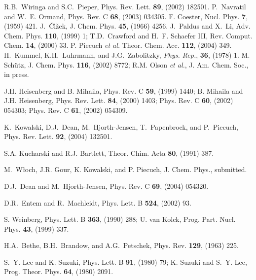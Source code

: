 \documentclass[epj]{svjour}
\begin{document}
\begin{thebibliography}{99}
%
R.B.~Wiringa and S.C.~Pieper, Phys. Rev. Lett. {\bf 89}, (2002) 182501.
%
P.~Navratil and W.~E. Ormand, Phys. Rev. C {\bf 68}, (2003) 034305.
%
F. Coester, Nucl. Phys. {\bf 7}, (1959) 421.
%
J.~{{\v C}{\'\i}{\v z}ek}, J. Chem. Phys. {\bf 45}, (1966) 4256.
%
J.~Paldus and X.~Li, Adv. Chem. Phys. {\bf 110}, (1999) 1;
T.D.~Crawford and H.~F. Schaefer III, Rev. Comput. Chem. {\bf 14}, (2000) 33.
%
P. Piecuch {\it et al.}
Theor. Chem. Acc. {\bf 112}, (2004) 349.
%
H.~Kummel, K.H.~Luhrmann, and J.G.~Zabolitzky, {\it Phys. Rep.},
{\bf 36}, (1978) 1.
%
M. Sch{\" u}tz,
J. Chem. Phys. {\bf 116}, (2002) 8772;
R.M. Olson {\it et al.},
J. Am. Chem. Soc., in press.

J.H. Heisenberg and B. Mihaila, Phys. Rev. C {\bf 59}, (1999) 1440;
B. Mihaila and J.H. Heisenberg, Phys. Rev. Lett. {\bf 84}, (2000) 1403;
Phys. Rev. C {\bf 60}, (2002) 054303;
Phys. Rev. C {\bf 61}, (2002) 054309.

K.~Kowalski, D.J.~Dean, M.~Hjorth-Jensen, T.~Papenbrock, and P.~Piecuch,
Phys. Rev. Lett. {\bf 92}, (2004) 132501.

S.A. Kucharski and R.J. Bartlett, Theor. Chim. Acta {\bf 80}, (1991) 387.

M.~W{\l}och, J.R. Gour, K. Kowalski, and P. Piecuch,
J. Chem. Phys., submitted.

D.J.~Dean and M.~Hjorth-Jensen, Phys. Rev. C {\bf 69}, (2004)
054320.

D.R.~Entem and R.~Machleidt, Phys. Lett. B {\bf 524}, (2002)
93.

S. Weinberg, Phys. Lett. B {\bf 363}, (1990) 288;
U. van Kolck, Prog. Part. Nucl. Phys. {\bf 43}, (1999) 337.

H.A.~Bethe, B.H.~Brandow, and A.G.~Petschek, Phys. Rev. {\bf 129}, (1963) 225.

S.~Y. Lee and K. Suzuki, Phys. Lett. B {\bf 91}, (1980) 79;
K. Suzuki and S.~Y. Lee, Prog. Theor. Phys. {\bf 64}, (1980) 2091.


\end{thebibliography}
\end{document}
